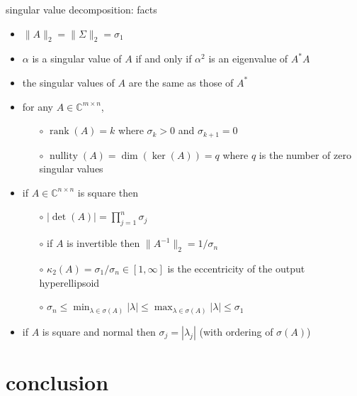 \documentclass[10pt,hyperref]{beamer}
\newcommand{\CC}{\mathbb{C}}
\newcommand{\rank}{\operatorname{rank}}
\begin{document}
\begin{frame}{singular value decomposition: facts}

\begin{itemize}
\item $\|A\|_2=\|\Sigma\|_2=\sigma_1$
\item $\alpha$ is a singular value of $A$ if and only if $\alpha^2$ is an eigenvalue of $A^*A$
\item the singular values of $A$ are the same as those of $A^*$
\item for any $A\in \CC^{m\times n}$,
    \begin{itemize}
    \item[$\circ$] $\rank(A)=k$ where $\sigma_k>0$ and $\sigma_{k+1}=0$
    \item[$\circ$] $\operatorname{nullity}(A)=\dim(\ker(A))=q$ where $q$ is the number of zero singular values
    \end{itemize}
\item if $A\in \CC^{n\times n}$ is square then
    \begin{itemize}
    \item[$\circ$] $|\det(A)| = \prod_{j=1}^n \sigma_j$
    \item[$\circ$] if $A$ is invertible then $\|A^{-1}\|_2 = 1/\sigma_n$
    \item[$\circ$] $\kappa_2(A) = \sigma_1/\sigma_n \in [1,\infty]$ is the eccentricity of the output hyperellipsoid
    \item[$\circ$] $\sigma_n \le \min_{\lambda\in\sigma(A)} |\lambda| \le \max_{\lambda\in\sigma(A)} |\lambda| \le \sigma_1$
    \end{itemize}
\item if $A$ is square and normal then $\sigma_j = |\lambda_j|$ (with ordering of $\sigma(A)$)
\end{itemize}
\end{frame}


\section{conclusion}
\end{document}
